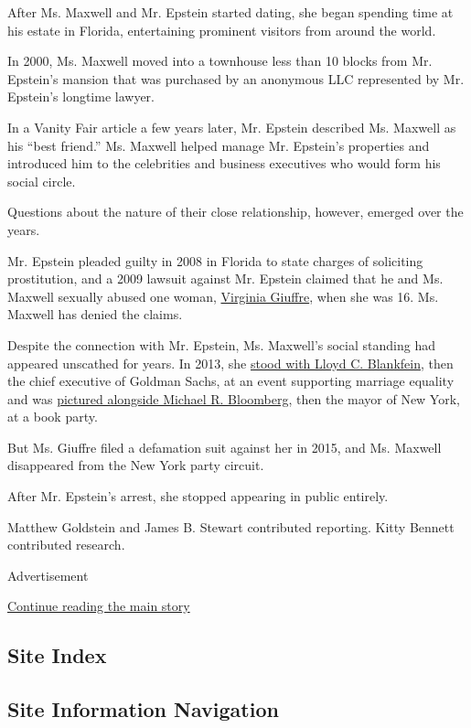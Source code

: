 After Ms. Maxwell and Mr. Epstein started dating, she began spending
time at his estate in Florida, entertaining prominent visitors from
around the world.

In 2000, Ms. Maxwell moved into a townhouse less than 10 blocks from Mr.
Epstein's mansion that was purchased by an anonymous LLC represented by
Mr. Epstein's longtime lawyer.

In a Vanity Fair article a few years later, Mr. Epstein described Ms.
Maxwell as his ``best friend.'' Ms. Maxwell helped manage Mr. Epstein's
properties and introduced him to the celebrities and business executives
who would form his social circle.

Questions about the nature of their close relationship, however, emerged
over the years.

Mr. Epstein pleaded guilty in 2008 in Florida to state charges of
soliciting prostitution, and a 2009 lawsuit against Mr. Epstein claimed
that he and Ms. Maxwell sexually abused one woman,
\href{https://www.nytimes3xbfgragh.onion/2019/08/09/nyregion/epstein-sex-slave-documents.html}{Virginia
Giuffre}, when she was 16. Ms. Maxwell has denied the claims.

Despite the connection with Mr. Epstein, Ms. Maxwell's social standing
had appeared unscathed for years. In 2013, she
\href{https://bfa.com/home/photo/679638?term=ghislaine\%20maxwell}{stood
with Lloyd C. Blankfein}, then the chief executive of Goldman Sachs, at
an event supporting marriage equality and was
\href{https://bfa.com/home/photo/852481?term=ghislaine\%20maxwell}{pictured
alongside Michael R. Bloomberg}, then the mayor of New York, at a book
party.

But Ms. Giuffre filed a defamation suit against her in 2015, and Ms.
Maxwell disappeared from the New York party circuit.

After Mr. Epstein's arrest, she stopped appearing in public entirely.

Matthew Goldstein and James B. Stewart contributed reporting. Kitty
Bennett contributed research.

Advertisement

\protect\hyperlink{after-bottom}{Continue reading the main story}

\hypertarget{site-index}{%
\subsection{Site Index}\label{site-index}}

\hypertarget{site-information-navigation}{%
\subsection{Site Information
Navigation}\label{site-information-navigation}}

